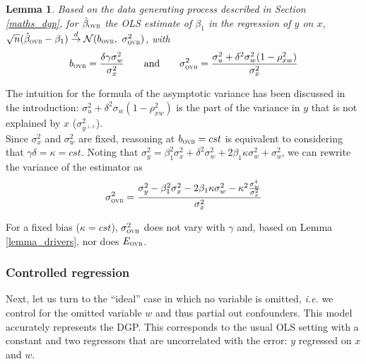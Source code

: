 \documentclass[usletter, 12pt]{article}
\newtheorem{lemma}{Lemma}
\begin{document}
				\begin{lemma}\label{lemma_ovb}
					Based on the data generating process described in Section \ref{maths_dgp}, for $\hat{\beta}_{\textsc{ovb}}$ the OLS estimate of $\beta_{1}$ in the regression of $y$ on $x$, $\sqrt{n} (\hat{\beta}_{\textsc{ovb}} - \beta_1 ) \overset{d}{\to} \mathcal{N}(b_{\textsc{ovb}} , \ \sigma_{\textsc{ovb}}^{2})$, with
					\[
						b_{\textsc{ovb}} = \dfrac{\delta \gamma \sigma_{w}^{2}}{\sigma_{x}^{2}} 
						\qquad \text{and} \qquad
						\sigma_{\textsc{ovb}}^{2} = \dfrac{\sigma_{u}^{2} + \delta^{2} \sigma_{w}^{2}(1 - \rho_{xw}^{2})}{\sigma_{x}^{2}}
					\]
				\end{lemma}
				
			The intuition for the formula of the asymptotic variance has been discussed in the introduction: $\sigma_{u}^{2} + \delta^{2} \sigma_{w}(1 - \rho_{xw}^{2})$ is the part of the variance in $y$ that is not explained by $x$ ($\sigma^{2}_{y^{\perp x}}$).\\
			
			Since $\sigma_{x}^{2}$ and $\sigma_{w}^{2}$ are fixed, reasoning at $b_{\textsc{ovb}} = cst$ is equivalent to considering that $\gamma \delta = \kappa = cst$. Noting that $\sigma_y^2 = \beta_1^2\sigma_x^2 + \delta^2\sigma_w^2 + 2\beta_1\kappa\sigma_w^2 + \sigma_u^2$, we can rewrite the variance of the estimator as
			~
			\[
				\sigma_{\textsc{ovb}}^{2} = \dfrac{\sigma_{y}^{2} - \beta_{1}^{2}\sigma_{x}^{2} - 2\beta_{1}\kappa\sigma_{w}^{2} - \kappa^{2}\frac{\sigma_{w}^{4}}{\sigma_{x}^{2}}}{ \sigma_{x}^{2}}
			\]
			
			 For a fixed bias ($\kappa = cst$),  $\sigma_{\textsc{ovb}}^{2}$ does not vary with $\gamma$ and, based on Lemma \ref{lemma_drivers},  nor does  $E_{\textsc{ovb}}$.

			
			\subsubsection{Controlled regression}
			
				Next, let us turn to the ``ideal'' case in which no variable is omitted, \textit{i.e.} we control for the omitted variable $w$ and thus partial out confounders. This model accurately represents the DGP.
%				
				This corresponds to the usual OLS setting with a constant and two regressors that are uncorrelated with the error: $y$ regressed on $x$ and $w$.
						
\end{document}
